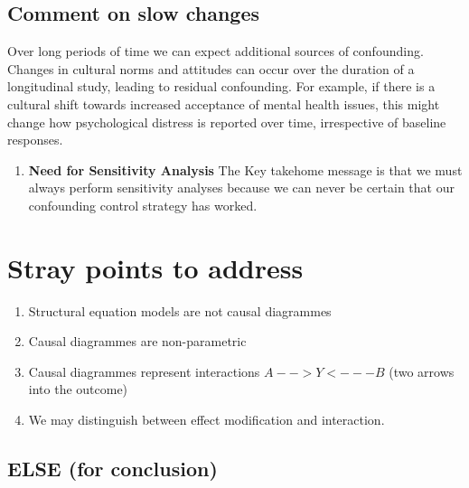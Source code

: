 \documentclass[
  singlecolumn]{report}
\providecommand{\tightlist}{%
  \setlength{\itemsep}{0pt}\setlength{\parskip}{0pt}}\usepackage{longtable,booktabs,array}
\begin{document}
\hypertarget{comment-on-slow-changes}{%
\subsection{Comment on slow changes}\label{comment-on-slow-changes}}

Over long periods of time we can expect additional sources of
confounding. Changes in cultural norms and attitudes can occur over the
duration of a longitudinal study, leading to residual confounding. For
example, if there is a cultural shift towards increased acceptance of
mental health issues, this might change how psychological distress is
reported over time, irrespective of baseline responses.

\begin{enumerate}
\def\labelenumi{\arabic{enumi}.}
\setcounter{enumi}{9}
\tightlist
\item
  \textbf{Need for Sensitivity Analysis} The Key takehome message is
  that we must always perform sensitivity analyses because we can never
  be certain that our confounding control strategy has worked.
\end{enumerate}

\hypertarget{stray-points-to-address}{%
\section{Stray points to address}\label{stray-points-to-address}}

\begin{enumerate}
\def\labelenumi{\arabic{enumi}.}
\tightlist
\item
  Structural equation models are not causal diagrammes
\item
  Causal diagrammes are non-parametric
\item
  Causal diagrammes represent interactions \(A -- > Y <--- B\) (two
  arrows into the outcome)
\item
  We may distinguish between effect modification and interaction.
\end{enumerate}

\hypertarget{else-for-conclusion}{%
\subsection{ELSE (for conclusion)}\label{else-for-conclusion}}
\end{document}
